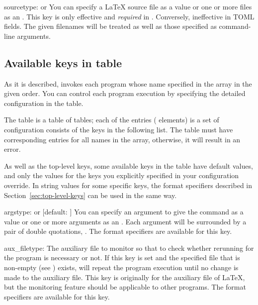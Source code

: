 \documentclass{llmk-doc}
\begin{document}
\begin{confkey}{source}{type:  or }
You can specify a {\LaTeX} source file as a  value or one or more
files as an . This key is only effective and
\emph{required} in . Conversely, ineffective in TOML fields.
The given filenames will be treated as well as those specified as command-line
arguments.
\end{confkey}

\subsection{Available keys in  table}
\label{sec:keys-in-programs}

As it is described,  invokes each program whose name specified in
the  array in the given order. You can control each program
execution by specifying the detailed configuration in the 
table.

The  table is a table of tables; each of the entries (\aka
elements) is a set of configuration consists of the keys in the following list.
The  table must have corresponding entries for all names in the
 array, otherwise, it will result in an error.

As well as the top-level keys, some available keys in the  table
have default values, and only the values for the keys you explicitly specified
in your configuration override. In string values for some specific keys, the
format specifiers described in Section~\ref{sec:top-level-keys} can be used in
the same way.

\begin{confkey}{args}{type:  or }
  [default: \code{["\%T"]}]
You can specify an argument to give the command as a  value or one
or more arguments as an . Each argument will be
surrounded by a pair of double quotations, \eg {}. The format
specifiers are available for this key.
\end{confkey}

\begin{confkey}{aux\_file}{type: }
The auxiliary file to monitor so that to check whether rerunning for the
program is necessary or not. If this key is set and the specified file that is
non-empty (see ) exists,  will repeat the
program execution until no change is made to the auxiliary file. This key is
originally for the auxiliary file of {\LaTeX}, but the monitoring feature
should be applicable to other programs. The format specifiers are available
for this key.
\end{confkey}
\end{document}
